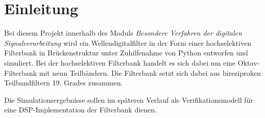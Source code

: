 %

\section{Einleitung}
Bei diesem Projekt innerhalb des Moduls \textit{Besondere Verfahren der digitalen Signalverarbeitung} wird ein Wellendigitalfilter in der Form einer hochselektiven Filterbank in Brückenstruktur unter Zuhilfenahme von Python entworfen und simuliert. Bei der hochselektiven Filterbank handelt es sich dabei um eine Oktav-Filterbank mit neun Teilbändern. Die Filterbank setzt sich dabei aus bireziproken Teilbandfiltern 19. Grades zusammen.\par 
Die Simulationsergebnisse sollen im späteren Verlauf als Verifikationsmodell für eine DSP-Implementation der Filterbank dienen.